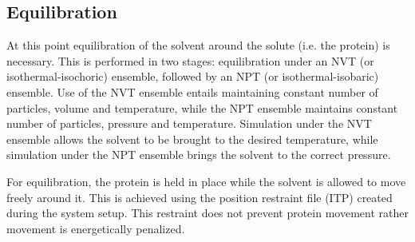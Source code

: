 \documentclass[twocolumn]{bmcart}%
\begin{document}
\subsection*{Equilibration}\label{equilibration}

At this point equilibration of the solvent around the solute (i.e. the protein) is necessary. This is performed in two stages: equilibration under an NVT (or isothermal-isochoric) ensemble, followed by an NPT (or isothermal-isobaric) ensemble. Use of the NVT ensemble entails maintaining constant number of particles, volume and temperature, while the NPT ensemble maintains constant number of particles, pressure and temperature. Simulation under the NVT ensemble allows the solvent to be brought to the desired temperature, while simulation under the NPT ensemble brings the solvent to the correct pressure.

For equilibration, the protein is held in place while the solvent is allowed to move freely around it. This is achieved using the position restraint file (ITP) created during the system setup. This restraint does not prevent protein movement rather movement is energetically penalized. 
\end{document}
